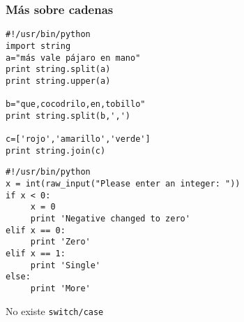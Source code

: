 %




\begin{frame}[fragile]

\frametitle{Más sobre cadenas}  

  \begin{footnotesize}
\begin{verbatim}
#!/usr/bin/python
import string
a="más vale pájaro en mano"
print string.split(a)
print string.upper(a)

b="que,cocodrilo,en,tobillo"
print string.split(b,',')

c=['rojo','amarillo','verde']
print string.join(c)

\end{verbatim}
  \end{footnotesize}



  
\end{frame}




\begin{frame}[fragile]
\begin{footnotesize}
\begin{verbatim}
#!/usr/bin/python
x = int(raw_input("Please enter an integer: "))
if x < 0:
     x = 0
     print 'Negative changed to zero'
elif x == 0:
     print 'Zero'
elif x == 1:
     print 'Single'
else:
     print 'More'
\end{verbatim}
\end{footnotesize}
  

No existe \verb|switch/case|
\end{frame}







